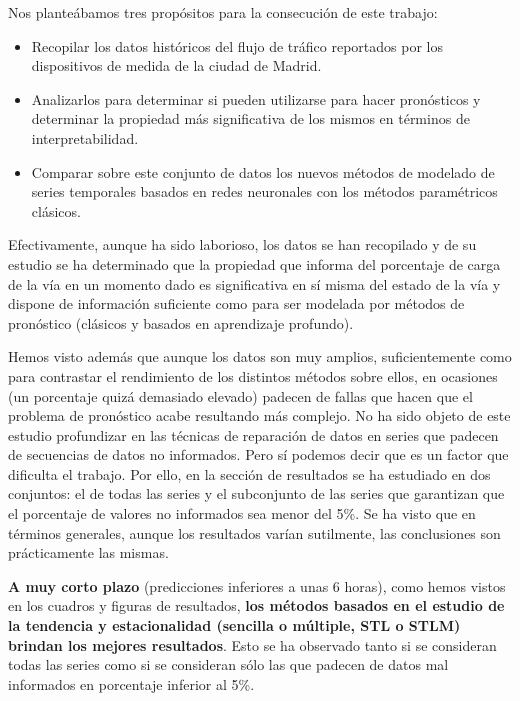 \documentclass[]{book}
\begin{document}
Nos planteábamos tres propósitos para la consecución de este trabajo:

\begin{itemize}
\item
  Recopilar los datos históricos del flujo de tráfico reportados por los
  dispositivos de medida de la ciudad de Madrid.
\item
  Analizarlos para determinar si pueden utilizarse para hacer
  pronósticos y determinar la propiedad más significativa de los mismos
  en términos de interpretabilidad.
\item
  Comparar sobre este conjunto de datos los nuevos métodos de modelado
  de series temporales basados en redes neuronales con los métodos
  paramétricos clásicos.
\end{itemize}

Efectivamente, aunque ha sido laborioso, los datos se han recopilado y
de su estudio se ha determinado que la propiedad que informa del
porcentaje de carga de la vía en un momento dado es significativa en sí
misma del estado de la vía y dispone de información suficiente como para
ser modelada por métodos de pronóstico (clásicos y basados en
aprendizaje profundo).

Hemos visto además que aunque los datos son muy amplios, suficientemente
como para contrastar el rendimiento de los distintos métodos sobre
ellos, en ocasiones (un porcentaje quizá demasiado elevado) padecen de
fallas que hacen que el problema de pronóstico acabe resultando más
complejo. No ha sido objeto de este estudio profundizar en las técnicas
de reparación de datos en series que padecen de secuencias de datos no
informados. Pero sí podemos decir que es un factor que dificulta el
trabajo. Por ello, en la sección de resultados se ha estudiado en dos
conjuntos: el de todas las series y el subconjunto de las series que
garantizan que el porcentaje de valores no informados sea menor del 5\%.
Se ha visto que en términos generales, aunque los resultados varían
sutilmente, las conclusiones son prácticamente las mismas.

\textbf{A muy corto plazo} (predicciones inferiores a unas 6 horas),
como hemos vistos en los cuadros y figuras de resultados, \textbf{los
métodos basados en el estudio de la tendencia y estacionalidad (sencilla
o múltiple, STL o STLM) brindan los mejores resultados}. Esto se ha
observado tanto si se consideran todas las series como si se consideran
sólo las que padecen de datos mal informados en porcentaje inferior al
5\%.
\end{document}
